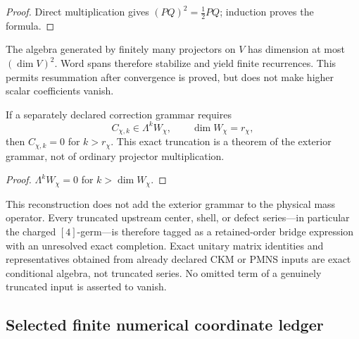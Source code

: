 \documentclass[11pt,a4paper]{article}
\begin{document}
\begin{proof}
Direct multiplication gives \((PQ)^2=\frac12PQ\); induction proves the
formula.
\end{proof}

\begin{proposition}
\label{p6:prop:finite-recurrence}
The algebra generated by finitely many projectors on \(V\) has dimension at
most \((\dim V)^2\).  Word spans therefore stabilize and yield finite
recurrences.  This permits resummation after convergence is proved, but does
not make higher scalar coefficients vanish.
\end{proposition}

\begin{theorem}
\label{p6:thm:exterior-terminality}
If a separately declared correction grammar requires
\[
C_{\chi,k}\in\Lambda^kW_\chi,
\qquad
\dim W_\chi=r_\chi,
\]
then \(C_{\chi,k}=0\) for \(k>r_\chi\).  This exact truncation is a theorem of
the exterior grammar, not of ordinary projector multiplication.
\end{theorem}

\begin{proof}
\(\Lambda^kW_\chi=0\) for \(k>\dim W_\chi\).
\end{proof}

\begin{convention}
\label{p6:conv:retained-order}
This reconstruction does not add the exterior grammar to the physical mass
operator.  Every truncated upstream center, shell, or defect series---in
particular the charged \([4]\)-germ---is therefore tagged as a retained-order
bridge expression with an unresolved exact completion.  Exact unitary
matrix identities and representatives obtained from already declared CKM or
PMNS inputs are exact conditional algebra, not truncated series.  No omitted
term of a genuinely truncated input is asserted to vanish.
\end{convention}

\subsection{Selected finite numerical coordinate ledger}
\label{p6:sec:numerical-ledger}
\end{document}
